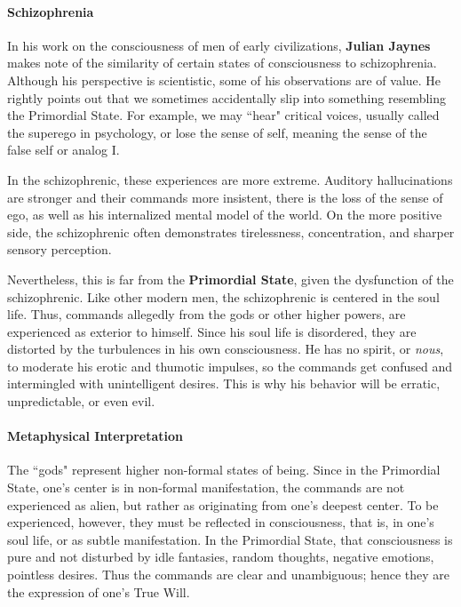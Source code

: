 \paragraph{Schizophrenia}
In his work on the consciousness of men of early civilizations, \textbf{Julian Jaynes} makes note of the similarity of certain states of consciousness to schizophrenia. Although his perspective is scientistic, some of his observations are of value. He rightly points out that we sometimes accidentally slip into something resembling the Primordial State. For example, we may ``hear" critical voices, usually called the superego in psychology, or lose the sense of self, meaning the sense of the false self or analog I.

In the schizophrenic, these experiences are more extreme. Auditory hallucinations are stronger and their commands more insistent, there is the loss of the sense of ego, as well as his internalized mental model of the world. On the more positive side, the schizophrenic often demonstrates tirelessness, concentration, and sharper sensory perception.

Nevertheless, this is far from the \textbf{Primordial State}, given the dysfunction of the schizophrenic. Like other modern men, the schizophrenic is centered in the soul life. Thus, commands allegedly from the gods or other higher powers, are experienced as exterior to himself. Since his soul life is disordered, they are distorted by the turbulences in his own consciousness. He has no spirit, or \emph{nous}, to moderate his erotic and thumotic impulses, so the commands get confused and intermingled with unintelligent desires. This is why his behavior will be erratic, unpredictable, or even evil.

\paragraph{Metaphysical Interpretation}
The ``gods" represent higher non-formal states of being. Since in the Primordial State, one's center is in non-formal manifestation, the commands are not experienced as alien, but rather as originating from one's deepest center. To be experienced, however, they must be reflected in consciousness, that is, in one's soul life, or as subtle manifestation. In the Primordial State, that consciousness is pure and not disturbed by idle fantasies, random thoughts, negative emotions, pointless desires. Thus the commands are clear and unambiguous; hence they are the expression of one's True Will.

